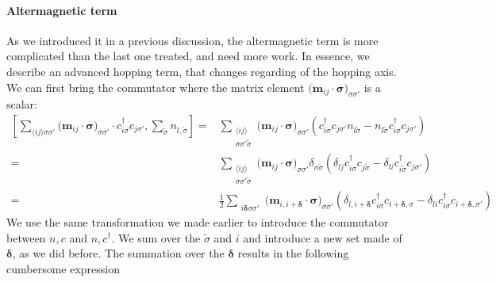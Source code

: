 \documentclass[../main.tex]{subfile}
\begin{document}
\paragraph{Altermagnetic term} $~$\\

As we introduced it in a previous discussion, the altermagnetic term is more complicated than the last one treated, and need more work. In essence, we describe an 
advanced hopping term, that changes regarding of the hopping axis.
We can first bring the commutator where the matrix element $\bigl(\bm{m}_{ij}\cdot\bm{\sigma}\bigr)_{\sigma\sigma'} $ is a scalar:
\begin{equation*}
    \begin{aligned}
    \left[\sum_{\langle i j \rangle\sigma\sigma'}\bigl(\bm{m}_{ij}\cdot\bm{\sigma}\bigr)_{\sigma\sigma'} 
         \cdot c_{i\sigma}^{\dagger}c_{j\sigma'}, \sum_{\tilde{\sigma}} n_{l,\tilde{\sigma}}\right] 
        =&\sum_{\substack{\langle i j \rangle \\\sigma\sigma'\tilde{\sigma}}} 
         \bigl(\bm{m}_{ij}\cdot\bm{\sigma}\bigr)_{\sigma\sigma'}  \left(c_{i\sigma}^{\dagger}c_{j\sigma'}n_{l\tilde{\sigma}} 
        -n_{l\tilde{\sigma}}c_{i\sigma}^{\dagger}c_{j\sigma'} \right)\\
        = &\sum_{\substack{\langle i j \rangle \\\sigma\sigma'\tilde{\sigma}}}  \bigl(\bm{m}_{ij}\cdot\bm{\sigma}\bigr)_{\sigma\sigma'}  
         \delta_{\sigma\tilde{\sigma}} \left(\delta_{lj}c_{i\sigma}^{\dagger}c_{j\tilde{\sigma}} - \delta_{li}c_{i\tilde{\sigma}}^{\dagger}c_{j\sigma'}\right)\\
        = &\frac{1}{2}\sum_{\substack{ i \bm{\delta}\sigma\sigma'}}  \bigl(\bm{m}_{i,i+\bm{\delta}}\cdot\bm{\sigma}\bigr)_{\sigma\sigma'}  
         \left(\delta_{l,i+\bm{\delta}}c_{i\sigma}^{\dagger}c_{i+\bm{\delta},\sigma} - \delta_{li}c_{i\sigma}^{\dagger}c_{i+\bm{\delta},\sigma'}\right)
    \end{aligned}
\end{equation*}
We use the same transformation we made earlier to introduce the commutator between $n,c$ and $n,c^{\dagger}$. We sum over the $\tilde{\sigma}$ and $i$ and 
introduce a new set made of $\bm{\delta}$, as we did before. The summation over the $\bm{\delta}$ results in the following cumbersome expression
\end{document}
